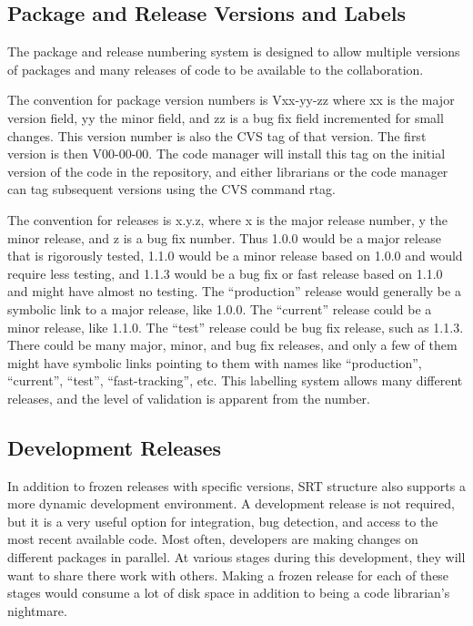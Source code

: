 \documentclass[12pt]{article}
\begin{document}
\subsection{Package and Release Versions and Labels}
The package and release numbering system is designed to allow multiple versions
of packages and many releases of code to be available to the collaboration.

The convention for package version numbers is Vxx-yy-zz where
xx is the major version field, yy the minor field, and zz is a bug fix
field incremented for small changes. This version number is also the 
CVS tag of 
that version. The first version is then V00-00-00.
The code manager will install this tag on the initial version of
the code in the repository, and either librarians or the code manager can tag 
subsequent versions using the CVS command rtag.

The convention for releases is x.y.z, where x is the 
major release number,
y the minor release, and z is a bug fix 
number. Thus 1.0.0 would be a major
release that is rigorously tested,  1.1.0 would be a minor release based on 
1.0.0 and would require less testing, and 1.1.3 would be a bug fix or fast 
release based on 1.1.0 and might have almost no testing.  The ``production''
release would generally be a symbolic link to a major release, like 1.0.0.
The ``current'' release could be a minor release, like 1.1.0. The ``test'' release 
could be bug fix release, such as 1.1.3.  There could be many major, minor,
and bug fix releases, and only a few of them might have symbolic links pointing
to them with names like ``production'', ``current'', ``test'',
``fast-tracking'', etc.
This labelling system allows many different releases, and the level of
validation is apparent from the number.

\subsection{Development Releases}
\label{sec_development}

In addition to frozen releases with specific versions, SRT structure
also supports a more dynamic development environment. A development release is 
not required, but it is a very useful option for integration, bug detection,
and access to the most recent available code. Most often, 
developers are making changes on different packages in parallel. At
various stages during this development, they will want to share there
work with others. Making a frozen release for each of these stages
would consume a lot of disk space in addition to being a code librarian's
nightmare. 
\end{document}
